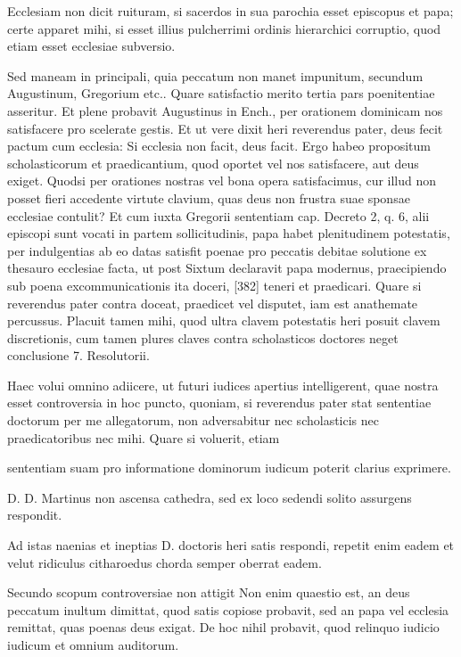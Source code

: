 Ecclesiam non dicit ruituram, si sacerdos in sua parochia esset episcopus et papa; certe apparet mihi, si esset illius pulcherrimi ordinis hierarchici corruptio, quod etiam esset ecclesiae subversio.

Sed maneam in principali, quia peccatum non manet impunitum, secundum Augustinum, Gregorium etc.. Quare satisfactio merito tertia pars poenitentiae asseritur. Et plene probavit Augustinus in Ench., per orationem dominicam nos satisfacere pro scelerate gestis. Et ut vere dixit heri reverendus pater, deus fecit pactum cum ecclesia: Si ecclesia non facit, deus facit. Ergo habeo propositum scholasticorum et praedicantium, quod oportet vel nos satisfacere, aut deus exiget. Quodsi per orationes nostras vel bona opera satisfacimus, cur illud non posset fieri accedente virtute clavium, quas deus non frustra suae sponsae ecclesiae contulit? Et cum iuxta Gregorii sententiam cap. Decreto 2, q. 6, alii episcopi sunt vocati in partem sollicitudinis, papa habet plenitudinem potestatis, per indulgentias ab eo datas satisfit poenae pro peccatis debitae solutione ex thesauro ecclesiae facta, ut post Sixtum declaravit papa modernus, praecipiendo sub poena excommunicationis ita doceri, [382] teneri et praedicari. Quare si reverendus pater contra doceat, praedicet vel disputet, iam est anathemate percussus. Placuit tamen mihi, quod ultra clavem potestatis heri posuit clavem discretionis, cum tamen plures claves contra scholasticos doctores neget conclusione 7. Resolutorii.

Haec volui omnino adiicere, ut futuri iudices apertius intelligerent, quae nostra esset controversia in hoc puncto, quoniam, si reverendus pater stat sententiae doctorum per me allegatorum, non adversabitur nec scholasticis nec praedicatoribus nec mihi. Quare si voluerit, etiam

sententiam suam pro informatione dominorum iudicum poterit clarius exprimere.

D. D. Martinus
non ascensa cathedra, sed ex loco sedendi solito
assurgens respondit.

Ad istas naenias et ineptias D. doctoris heri satis respondi, repetit enim eadem et velut ridiculus citharoedus chorda semper oberrat eadem.

Secundo scopum controversiae non attigit Non enim quaestio est, an deus peccatum inultum dimittat, quod satis copiose probavit, sed an papa vel ecclesia remittat, quas poenas deus exigat. De hoc nihil probavit, quod relinquo iudicio iudicum et omnium auditorum.

